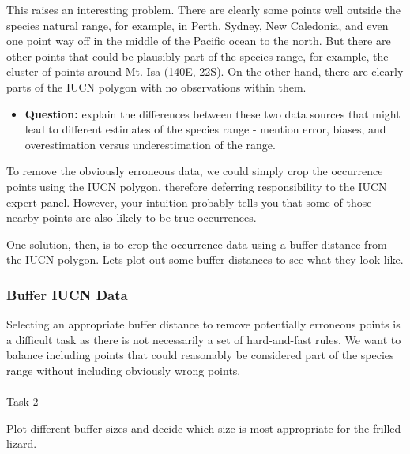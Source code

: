 \documentclass[
  letterpaper,
  DIV=11,
  numbers=noendperiod]{scrartcl}
\makeatletter
\let\oldparagraph\paragraph
\renewcommand{\paragraph}{
    \@ifstar
      \xxxParagraphStar
      \xxxParagraphNoStar
  }
\newcommand{\xxxParagraphStar}[1]{\oldparagraph*{#1}\mbox{}}
\newcommand{\xxxParagraphNoStar}[1]{\oldparagraph{#1}\mbox{}}
\providecommand{\tightlist}{%
  \setlength{\itemsep}{0pt}\setlength{\parskip}{0pt}}
\makeatother
\begin{document}
This raises an interesting problem. There are clearly some points well
outside the species natural range, for example, in Perth, Sydney, New
Caledonia, and even one point way off in the middle of the Pacific ocean
to the north. But there are other points that could be plausibly part of
the species range, for example, the cluster of points around Mt. Isa
(140E, 22S). On the other hand, there are clearly parts of the IUCN
polygon with no observations within them.

\begin{itemize}
\tightlist
\item
  \textbf{Question:} explain the differences between these two data
  sources that might lead to different estimates of the species range -
  mention error, biases, and overestimation versus underestimation of
  the range.
\end{itemize}

To remove the obviously erroneous data, we could simply crop the
occurrence points using the IUCN polygon, therefore deferring
responsibility to the IUCN expert panel. However, your intuition
probably tells you that some of those nearby points are also likely to
be true occurrences.

One solution, then, is to crop the occurrence data using a buffer
distance from the IUCN polygon. Lets plot out some buffer distances to
see what they look like.

\subsubsection{Buffer IUCN Data}\label{buffer-iucn-data}

Selecting an appropriate buffer distance to remove potentially erroneous
points is a difficult task as there is not necessarily a set of
hard-and-fast rules. We want to balance including points that could
reasonably be considered part of the species range without including
obviously wrong points.

\paragraph{Task 2}\label{task-2}

Plot different buffer sizes and decide which size is most appropriate
for the frilled lizard.
\end{document}
